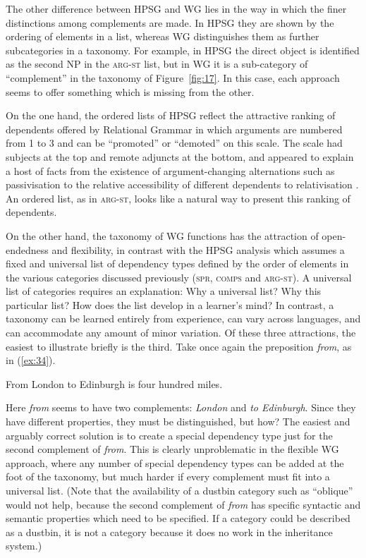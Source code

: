 \documentclass[output=paper
 	        ,biblatex
                ,babelshorthands
                ,newtxmath
                ,draftmode
                ,colorlinks, citecolor=brown
]{langscibook}
\begin{document}
The other difference between HPSG and WG lies in the way in which the finer distinctions among complements are made. In HPSG they are shown by the ordering of elements in a list, whereas WG distinguishes them as further subcategories in a taxonomy. For example, in HPSG the direct object is identified as the second NP in the \textsc{arg-st} list, but in WG it is a sub-category of ``complement'' in the taxonomy of Figure~\ref{fig:17}. In this case, each approach seems to offer something which is missing from the other.

On the one hand, the ordered lists of HPSG reflect the attractive ranking of dependents offered by Relational Grammar \citep{PP83a-u,Blake1990} in which arguments are numbered from 1 to 3 and can be ``promoted'' or ``demoted'' on this scale. The scale had subjects at the top and remote adjuncts at the bottom, and appeared to explain a host of facts from the existence of argument-changing alternations such as passivisation \citep{Levin93a-u} to the relative accessibility of different dependents to relativisation \citep{KC77a}. An ordered list, as in \textsc{arg-st}, looks like a natural way to present this ranking of dependents.

On the other hand, the taxonomy of WG functions has the attraction of open-endedness and flexibility, in contrast with the HPSG analysis which assumes a fixed and universal list of dependency types defined by the order of elements in the various categories discussed previously (\textsc{spr}, \textsc{comps} and \textsc{arg-st}). A universal list of categories requires an explanation: Why a universal list? Why this particular list? How does the list develop in a learner’s mind? In contrast, a taxonomy can be learned entirely from experience, can vary across languages, and can accommodate any amount of minor variation. Of these three attractions, the easiest to illustrate briefly is the third. Take once again the  preposition \emph{from}, as in (\ref{ex:34}).

\begin{exe}
	\ex \label{ex:34} From London to Edinburgh is four hundred miles.
\end{exe}

Here \emph{from} seems to have two complements: \emph{London} and \emph{to Edinburgh}. Since they have different properties, they must be distinguished, but how? The easiest and arguably correct solution is to create a special dependency type just for the second complement of \emph{from}. This is clearly unproblematic in the flexible WG approach, where any number of special dependency types can be added at the foot of the taxonomy, but much harder if every complement must fit into a universal list. (Note that the availability of a dustbin category such as ``oblique'' would not help, because the second complement of \emph{from} has specific syntactic and semantic properties which need to be specified. If a category could be described as a dustbin, it is not a category because it does no work in the inheritance system.)
\end{document}
